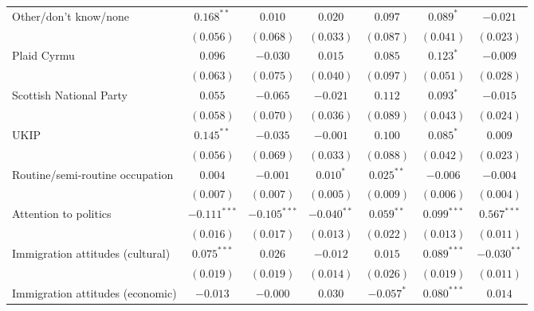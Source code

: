 \documentclass{article}
\begin{document}
\begin{table}
\begin{center}
{\begin{tabular}{l c c c c c c}
Other/don't know/none            & $0.168^{**}$   & $0.010$        & $0.020$        & $0.097$        & $0.089^{*}$    & $-0.021$       \\
                                 & $(0.056)$      & $(0.068)$      & $(0.033)$      & $(0.087)$      & $(0.041)$      & $(0.023)$      \\
Plaid Cyrmu                      & $0.096$        & $-0.030$       & $0.015$        & $0.085$        & $0.123^{*}$    & $-0.009$       \\
                                 & $(0.063)$      & $(0.075)$      & $(0.040)$      & $(0.097)$      & $(0.051)$      & $(0.028)$      \\
Scottish National Party          & $0.055$        & $-0.065$       & $-0.021$       & $0.112$        & $0.093^{*}$    & $-0.015$       \\
                                 & $(0.058)$      & $(0.070)$      & $(0.036)$      & $(0.089)$      & $(0.043)$      & $(0.024)$      \\
UKIP                             & $0.145^{**}$   & $-0.035$       & $-0.001$       & $0.100$        & $0.085^{*}$    & $0.009$        \\
                                 & $(0.056)$      & $(0.069)$      & $(0.033)$      & $(0.088)$      & $(0.042)$      & $(0.023)$      \\
Routine/semi-routine occupation  & $0.004$        & $-0.001$       & $0.010^{*}$    & $0.025^{**}$   & $-0.006$       & $-0.004$       \\
                                 & $(0.007)$      & $(0.007)$      & $(0.005)$      & $(0.009)$      & $(0.006)$      & $(0.004)$      \\
Attention to politics            & $-0.111^{***}$ & $-0.105^{***}$ & $-0.040^{**}$  & $0.059^{**}$   & $0.099^{***}$  & $0.567^{***}$  \\
                                 & $(0.016)$      & $(0.017)$      & $(0.013)$      & $(0.022)$      & $(0.013)$      & $(0.011)$      \\
Immigration attitudes (cultural) & $0.075^{***}$  & $0.026$        & $-0.012$       & $0.015$        & $0.089^{***}$  & $-0.030^{**}$  \\
                                 & $(0.019)$      & $(0.019)$      & $(0.014)$      & $(0.026)$      & $(0.019)$      & $(0.011)$      \\
Immigration attitudes (economic) & $-0.013$       & $-0.000$       & $0.030$        & $-0.057^{*}$   & $0.080^{***}$  & $0.014$        \\

\end{tabular}}
\end{center}
\end{table}
\end{document}
